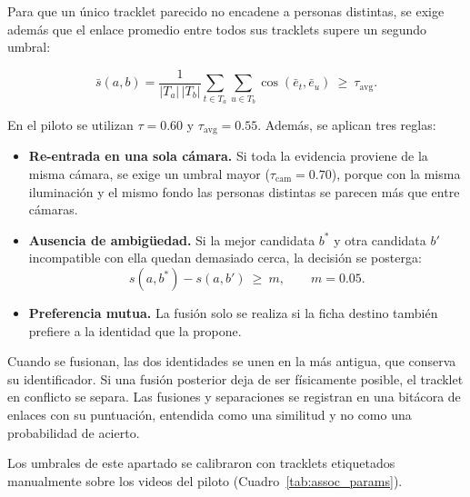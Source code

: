 \documentclass[12pt,letterpaper]{article}
\begin{document}
Para que un único tracklet parecido no encadene a personas distintas, se
exige además que el enlace promedio entre todos sus tracklets supere un
segundo umbral:

\begin{equation}
\bar{s}(a,b)=
\frac{1}{|T_a|\,|T_b|}
\sum_{t\in T_a}\sum_{u\in T_b}
\cos\!\left(\bar{e}_t,\bar{e}_u\right)
\ \geq\ \tau_{\text{avg}} .
\end{equation}

En el piloto se utilizan $\tau=0.60$ y $\tau_{\text{avg}}=0.55$. Además,
se aplican tres reglas:

\begin{itemize}
    \item \textbf{Re-entrada en una sola cámara.} Si toda la evidencia
    proviene de la misma cámara, se exige un umbral mayor
    ($\tau_{\text{cam}}=0.70$), porque con la misma iluminación y el
    mismo fondo las personas distintas se parecen más que entre cámaras.
    \item \textbf{Ausencia de ambigüedad.} Si la mejor candidata $b^{*}$ y
    otra candidata $b'$ incompatible con ella quedan demasiado cerca, la
    decisión se posterga:
    \begin{equation}
    s(a,b^{*})-s(a,b')\ \geq\ m, \qquad m=0.05 .
    \end{equation}
    \item \textbf{Preferencia mutua.} La fusión solo se realiza si la
    ficha destino también prefiere a la identidad que la propone.
\end{itemize}

Cuando se fusionan, las dos identidades se unen en la más antigua, que
conserva su identificador. Si una fusión posterior deja de ser
físicamente posible, el tracklet en conflicto se separa. Las fusiones y
separaciones se registran en una bitácora de enlaces con su puntuación,
entendida como una similitud y no como una probabilidad de acierto.

Los umbrales de este apartado se calibraron con tracklets etiquetados
manualmente sobre los videos del piloto (Cuadro~\ref{tab:assoc_params}).
\end{document}

